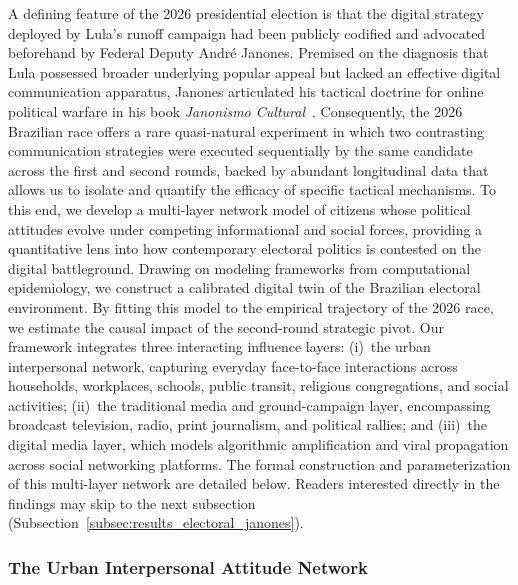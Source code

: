 \documentclass{article}
\begin{document}
A defining feature of the 2026 presidential election is that the digital strategy deployed by Lula's runoff campaign had been publicly codified and advocated beforehand by Federal Deputy Andr\'e Janones. Premised on the diagnosis that Lula possessed broader underlying popular appeal but lacked an effective digital communication apparatus, Janones articulated his tactical doctrine for online political warfare in his book \emph{Janonismo Cultural}~\citep{janones2023janonismo}. Consequently, the 2026 Brazilian race offers a rare quasi-natural experiment in which two contrasting communication strategies were executed sequentially by the same candidate across the first and second rounds, backed by abundant longitudinal data that allows us to isolate and quantify the efficacy of specific tactical mechanisms. To this end, we develop a multi-layer network model of citizens whose political attitudes evolve under competing informational and social forces, providing a quantitative lens into how contemporary electoral politics is contested on the digital battleground. Drawing on modeling frameworks from computational epidemiology, we construct a calibrated digital twin of the Brazilian electoral environment. By fitting this model to the empirical trajectory of the 2026 race, we estimate the causal impact of the second-round strategic pivot. Our framework integrates three interacting influence layers: (i)~the urban interpersonal network, capturing everyday face-to-face interactions across households, workplaces, schools, public transit, religious congregations, and social activities; (ii)~the traditional media and ground-campaign layer, encompassing broadcast television, radio, print journalism, and political rallies; and (iii)~the digital media layer, which models algorithmic amplification and viral propagation across social networking platforms. The formal construction and parameterization of this multi-layer network are detailed below. Readers interested directly in the findings may skip to the next subsection (Subsection~\ref{subsec:results_electoral_janones}).



\subsubsection*{The Urban Interpersonal Attitude Network}
\end{document}
